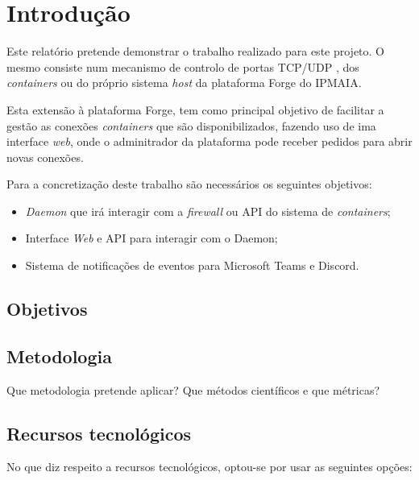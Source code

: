 \chapter{Introdução}
\label{chap:introduction}

Este relatório pretende demonstrar o trabalho realizado para este projeto.
O mesmo consiste num mecanismo de controlo de portas TCP/UDP \cite{rfc9293},
\cite{rfc768} dos \textit{containers} ou do próprio sistema \textit{host}
da plataforma Forge do IPMAIA.

Esta extensão à plataforma Forge, tem 
como principal objetivo de facilitar a gestão as conexões \textit{containers} 
que são disponibilizados, fazendo uso de ima interface \textit{web}, onde o adminitrador da 
plataforma pode receber pedidos para abrir novas conexões. 

Para a concretização deste trabalho são necessários os seguintes objetivos:\\

\begin{itemize}
\item \textit{Daemon} que irá interagir com a \textit{firewall} ou API do sistema de \textit{containers};
\item Interface \textit{Web} e API para interagir com o Daemon;
\item Sistema de notificações de eventos para Microsoft Teams e Discord.
\end{itemize}


\section{Objetivos}
\label{sec:object}




\section{Metodologia}
\label{sec:intro_method}
Que metodologia pretende aplicar? Que métodos científicos e que métricas?

\section{Recursos tecnológicos}
\label{sec:intro_resources}


No que diz respeito a recursos tecnológicos, optou-se por usar as seguintes opções:

